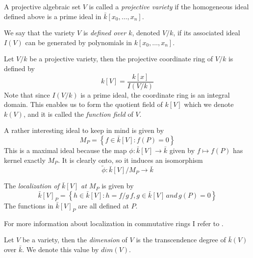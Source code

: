 \begin{mydef}
 A projective algebraic set $V$ is called a \emph{projective variety} if the homogeneous
ideal defined above is a prime ideal in $\bar{k}[x_0,\ldots,x_n]$.
\end{mydef}

We say that the variety $V$ is \emph{defined over $k$}, denoted $V/k$, if its associated ideal $I(V)$
can be generated by polynomials in $k[x_0,\ldots,x_n]$.

\begin{mydef}
 Let $V/k$ be a projective variety, then the projective coordinate ring of $V/k$ is defined by
$$ k[V] = \frac{k[x]}{I(V/k)}$$
Note that since $I(V/k)$ is a prime ideal, the coordinate ring is an integral domain.
This enables us to form the quotient field of $k[V]$ which we denote $k(V)$, and it is called
the \emph{function field} of $V$.
\end{mydef}

A rather interesting ideal to keep in mind is given by
$$ M_P = \left\{ f\in \bar{k}[V] : f(P)=0 \right\} $$
This is a maximal ideal because the map $\phi: \bar{k}[V] \rightarrow \bar{k}$ given by
$ f \mapsto f(P) $ has kernel exactly $M_P$. It is clearly onto, so it induces an
isomorphism $$\tilde{\phi}: \bar{k}[V]/M_P \rightarrow \bar{k} $$

\begin{mydef}
 The \emph{localization of $\bar{k}[V]$ at $M_P$} is given by
$$ \bar{k}[V]_P = \left\{ h \in \bar{k}[V] : h = f/g\, f,g\in \bar{k}[V]\, and\, g(P)=0 \right\} $$
The functions in $\bar{k}[V]_P$ are all defined at $P$.
\end{mydef}

For more information about localization in commutative rings I refer to \cite{Hideyuki}.


\begin{mydef}
 Let $V$ be a variety, then the \emph{dimension} of $V$ is the transcendence degree of $\bar{k}(V)$ over
$\bar{k}$. We denote this value by $dim(V)$.
\end{mydef}

